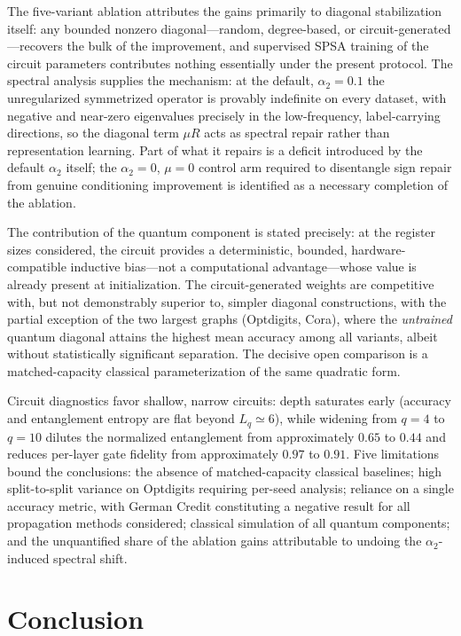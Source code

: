 \documentclass[11pt,a4paper]{article}
\begin{document}
The five-variant ablation attributes the gains primarily to diagonal
stabilization itself: any bounded nonzero diagonal---random, degree-based,
or circuit-generated---recovers the bulk of the improvement, and supervised
SPSA training of the circuit parameters contributes nothing essentially
under the present protocol. The spectral analysis supplies the mechanism:
at the default, $\alpha_2=0.1$ the unregularized symmetrized operator is
provably indefinite on every dataset, with negative and near-zero
eigenvalues precisely in the low-frequency, label-carrying directions, so
the diagonal term $\mu R$ acts as spectral repair rather than
representation learning. Part of what it repairs is a deficit introduced by
the default $\alpha_2$ itself; the $\alpha_2=0$, $\mu=0$ control arm
required to disentangle sign repair from genuine conditioning improvement
is identified as a necessary completion of the ablation.

The contribution of the quantum component is stated precisely: at the
register sizes considered, the circuit provides a deterministic, bounded,
hardware-compatible inductive bias---not a computational advantage---whose
value is already present at initialization. The circuit-generated weights
are competitive with, but not demonstrably superior to, simpler diagonal
constructions, with the partial exception of the two largest graphs
(Optdigits, Cora), where the \emph{untrained} quantum diagonal attains the
highest mean accuracy among all variants, albeit without statistically
significant separation. The decisive open comparison is a matched-capacity
classical parameterization of the same quadratic form.

Circuit diagnostics favor shallow, narrow circuits: depth saturates early
(accuracy and entanglement entropy are flat beyond $L_q\simeq 6$), while
widening from $q=4$ to $q=10$ dilutes the normalized entanglement from
approximately $0.65$ to $0.44$ and reduces per-layer gate fidelity from
approximately $0.97$ to $0.91$. Five limitations bound the conclusions:
the absence of matched-capacity classical baselines; high split-to-split
variance on Optdigits requiring per-seed analysis; reliance on a single
accuracy metric, with German Credit constituting a negative result for all
propagation methods considered; classical simulation of all quantum
components; and the unquantified share of the ablation gains attributable
to undoing the $\alpha_2$-induced spectral shift.

\section{Conclusion}
\label{sec:conclusion}
\end{document}
